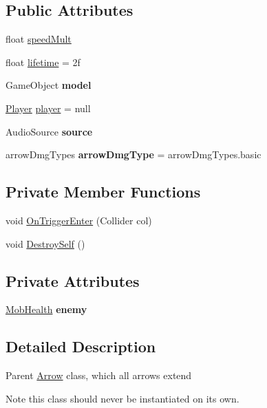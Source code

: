 \subsection*{Public Attributes}
\begin{DoxyCompactItemize}
\item 
float \hyperlink{class_arrow_aae6ab7eee0fa3a72f17c4c46ce391e8a}{speed\+Mult}
\item 
float \hyperlink{class_arrow_a1ee7f10c0328ab7f8dccc8fcd061494b}{lifetime} = 2f
\item 
\mbox{\label{class_arrow_a75efd0005fcd17e1425c4536b3c1c48b}} 
Game\+Object {\bfseries model}
\item 
\hyperlink{class_player}{Player} \hyperlink{class_arrow_ac895e2c34f4eebe49198b1139b966541}{player} = null
\item 
\mbox{\label{class_arrow_a312ad503e7ac9a4d4548c4a7ea096f75}} 
Audio\+Source {\bfseries source}
\item 
\mbox{\label{class_arrow_ab10f23b78a724c0948d852e3fa11a2c1}} 
arrow\+Dmg\+Types {\bfseries arrow\+Dmg\+Type} = arrow\+Dmg\+Types.\+basic
\end{DoxyCompactItemize}
\subsection*{Private Member Functions}
\begin{DoxyCompactItemize}
\item 
void \hyperlink{class_arrow_a186cf27bfba2bb5ce6b6427a44889858}{On\+Trigger\+Enter} (Collider col)
\item 
void \hyperlink{class_arrow_a87945ea993d85a6e1d1a59cd10b2358e}{Destroy\+Self} ()
\end{DoxyCompactItemize}
\subsection*{Private Attributes}
\begin{DoxyCompactItemize}
\item 
\mbox{\label{class_arrow_a3fbdd74dc4c23d765744ece303a9599e}} 
\hyperlink{class_mob_health}{Mob\+Health} {\bfseries enemy}
\end{DoxyCompactItemize}


\subsection{Detailed Description}
Parent \hyperlink{class_arrow}{Arrow} class, which all arrows extend \begin{DoxyNote}{Note}
this class should never be instantiated on its own. 
\end{DoxyNote}


